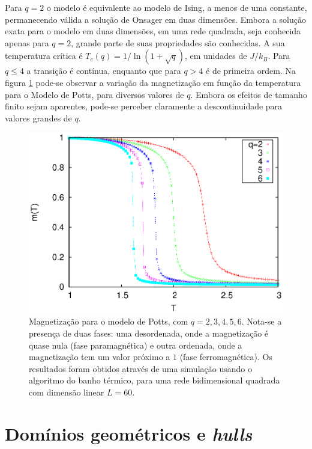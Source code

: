 Para $q=2$ o modelo é equivalente ao modelo de Ising, a menos de uma constante, permanecendo válida a solução de Onsager em duas dimensões. Embora a solução exata para o modelo em duas dimensões, em uma rede quadrada, seja conhecida apenas para $q=2$, grande parte de suas propriedades são conhecidas. A sua temperatura crítica é $T_c(q) = 1/\ln(1+\sqrt{q})$, em unidades de $J/k_B$. Para $q \le 4$ a transição é contínua, enquanto que para $q>4$ é de primeira ordem. Na figura \ref{fig.MagPotts} pode-se observar a variação da magnetização em função da temperatura para o Modelo de Potts, para diversos valores de $q$. Embora os efeitos de tamanho finito sejam aparentes, pode-se perceber claramente a descontinuidade para valores grandes de $q$.

\begin{figure}
 \centering
 \includegraphics[width=14cm]{img/MagPotts.eps}
 \caption{Magnetização para o modelo de Potts, com $q=2, 3, 4, 5, 6$. Nota-se a presença de duas fases: uma desordenada, onde a magnetização é quase nula (fase paramagnética) e outra ordenada, onde a magnetização tem um valor próximo a $1$ (fase ferromagnética). Os resultados foram obtidos através de uma simulação usando o algoritmo do banho térmico, para uma rede bidimensional quadrada com dimensão linear $L=60$.}
\label{fig.MagPotts}
\end{figure}


\section{Domínios geométricos e \textit{hulls}}

